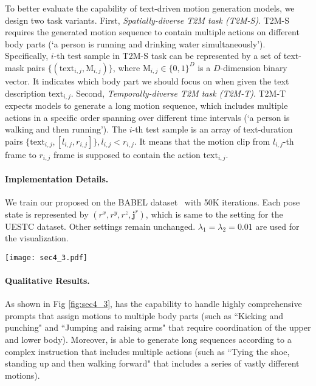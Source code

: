 To better evaluate the capability of text-driven motion generation models, we design two task variants. 
First, \textit{Spatially-diverse T2M task (T2M-S)}. T2M-S requires the generated motion sequence to contain multiple actions on different body parts (\eg `a person is running and drinking water simultaneously'). Specifically, $i$-th test sample in T2M-S task can be represented by a set of text-mask pairs $\{(\textrm{text}_{i,j}, \mathrm{M}_{i,j})\}$, where $\mathrm{M}_{i,j} \in \{0,1\}^D$ is a $D$-dimension binary vector. It indicates which body part we should focus on when given the text description $\textrm{text}_{i,j}$.
Second, \textit{Temporally-diverse T2M task (T2M-T)}. T2M-T expects models to generate a long motion sequence, which includes multiple actions in a specific order spanning over different time intervals (\eg `a person is walking and then running'). The $i$-th test sample is an array of text-duration pairs $\{\textrm{text}_{i,j}, [l_{i,j}, r_{i,j}]\}, l_{i,j} < r_{i,j}$. It means that the motion clip from  $l_{i,j}$-th frame to $r_{i,j}$ frame is supposed to contain the action $\textrm{text}_{i,j}$.

\paragraph{Implementation Details.}\label{sec4_3_2} 
We train our proposed \name on the BABEL dataset~\citep{punnakkal2021babel} with 50K iterations. Each pose state is represented by $(r^x, r^y, r^z, \mathbf{j}^r)$, which is same to the setting for the UESTC dataset. Other settings remain unchanged. $\lambda_1 =\lambda_2 = 0.01$ are used for the visualization.

\begin{figure*}[t]
    \centering
    \texttt{[image: sec4\_3.pdf]}
    \caption{\textbf{Qualitative results on the BABEL dataset.} \name is able to generate dynamic sequences according to complicated prompt that involves multiple body parts or actions.}
    \label{fig:sec4_3}
\end{figure*}

\paragraph{Qualitative Results.}\label{sec4_3_4}
As shown in Fig \ref{fig:sec4_3}, \name has the capability to handle highly comprehensive prompts that assign motions to multiple body parts (such as ``Kicking and punching" and ``Jumping and raising arms" that require coordination of the upper and lower body). Moreover, \name is able to generate long sequences according to a complex instruction that includes multiple actions (such as ``Tying the shoe, standing up and then walking forward" that includes a series of vastly different motions).


